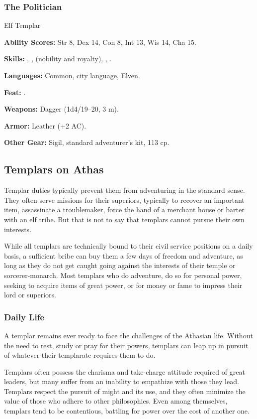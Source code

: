 \subsubsection{The Politician}
Elf Templar

\textbf{Ability Scores:} Str 8, Dex 14, Con 8, Int 13, Wis 14, Cha 15.

\textbf{Skills:} , ,  (nobility and royalty), , .

\textbf{Languages:} Common, city language, Elven.

\textbf{Feat:} .

\textbf{Weapons:} Dagger (1d4/19--20, 3 m).

\textbf{Armor:} Leather (+2 AC).

\textbf{Other Gear:} Sigil, standard adventurer's kit, 113 cp.


\subsection{Templars on Athas}
Templar duties typically prevent them from adventuring in the standard sense. They often serve missions for their superiors, typically to recover an important item, assassinate a troublemaker, force the hand of a merchant house or barter with an elf tribe. But that is not to say that templars cannot pursue their own interests.

While all templars are technically bound to their civil service positions on a daily basis, a sufficient bribe can buy them a few days of freedom and adventure, as long as they do not get caught going against the interests of their temple or sorcerer-monarch. Most templars who do adventure, do so for personal power, seeking to acquire items of great power, or for money or fame to impress their lord or superiors.

\subsubsection{Daily Life}
A templar remains ever ready to face the challenges of the Athasian life. Without the need to rest, study or pray for their powers, templars can leap up in pursuit of whatever their templarate requires them to do.

Templars often possess the charisma and take-charge attitude required of great leaders, but many suffer from an inability to empathize with those they lead. Templars respect the pursuit of might and its use, and they often minimize the value of those who adhere to other philosophies. Even among themselves, templars tend to be contentious, battling for power over the cost of another one.

